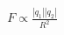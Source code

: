 \documentclass[preview]{standalone}
\begin{document}
\begin{align*}
F \propto \frac{|q_1||q_2|}{R^2}
\end{align*}
\end{document}
